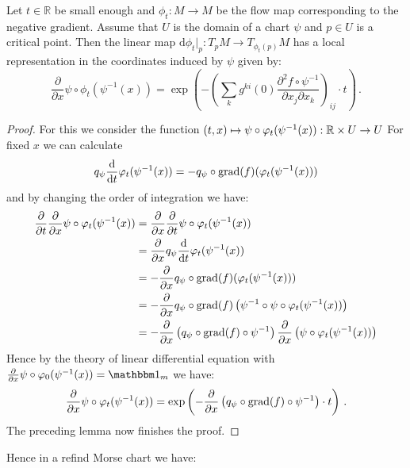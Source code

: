  
\begin{lemma}
Let $t\in \mathbb{R}$ be small enough and $\phi_t: M\to M$ be the flow map corresponding to the negative gradient. Assume that $U$ is the domain of a chart $\psi$ and $p\in U$ is a critical point. Then the linear map $\mathrm{d} \phi_t \big|_p: T_pM\to T_{\phi_t(p)}M$ has a local representation in the coordinates induced by $\psi$ given by:
\[
\frac{\partial}{\partial x} \psi \circ \phi_t(\psi^{-1}(x))=\exp\left(-\left(\sum_{k}g^{ki}(0)\frac{\partial ^2 f\circ \psi^{-1} }{\partial x_j \partial x_k} \right)_{ij} \cdot t \right) \, .
\]
\end{lemma}
\begin{proof}
For this we consider the function $ (t,x)\mapsto \psi \circ  \varphi_t(\psi^{-1}(x)):\mathbb{R} \times U \to U$ For fixed $x$ we can calculate
\begin{align*}
	q_{\psi}\frac{\mathop{}\!\mathrm{d}}{\mathop{}\!\mathrm{d} t} \varphi_t(\psi^{-1}(x))=-q_{\psi} \circ \mathrm{grad}(f)(\varphi_t(\psi^{-1}(x)))
\end{align*} and by changing the order of integration we have:
\begin{align*}
	\frac{\partial}{\partial t}   \frac{\partial}{\partial x} \psi \circ \varphi_t(\psi^{-1}(x))
	&= \frac{\partial}{\partial x}   \frac{\partial}{\partial t} \psi \circ \varphi_t(\psi^{-1}(x))\\
	&= \frac{\partial}{\partial x} q_\psi \frac{\mathop{}\!\mathrm{d} }{\mathop{}\!\mathrm{d} t}  \varphi_t(\psi^{-1}(x))  \\
	&= -\frac{\partial}{\partial x} q_{\psi} \circ \mathrm{grad}(f)(\varphi_t(\psi^{-1}(x)))	\\
	&= -\frac{\partial}{\partial x} q_{\psi} \circ \mathrm{grad}(f)\left(\psi^{-1}\circ \psi\circ \varphi_t(\psi^{-1}(x))\right)\\
	&=-\frac{\partial}{\partial x} \left( q_{\psi} \circ \mathrm{grad}(f)\circ \psi^{-1} \right)\frac{\partial }{\partial x}  \left(\psi\circ \varphi_t(\psi^{-1}(x))\right)
\end{align*}
Hence by the theory of linear differential equation with $\frac{\partial}{\partial x} \psi \circ \phi_0(\psi^{-1}(x))=\Idm_m$ we have:
\begin{align*}
	\frac{\partial}{\partial x} \psi \circ \varphi_t(\psi^{-1}(x))=\exp\left(-\frac{\partial}{\partial x} \left( q_{\psi} \circ \mathrm{grad}(f)\circ \psi^{-1} \right)\cdot t \right) \, .
\end{align*} The preceding lemma now finishes the proof.

\end{proof}
Hence in a refind Morse chart we have: 
